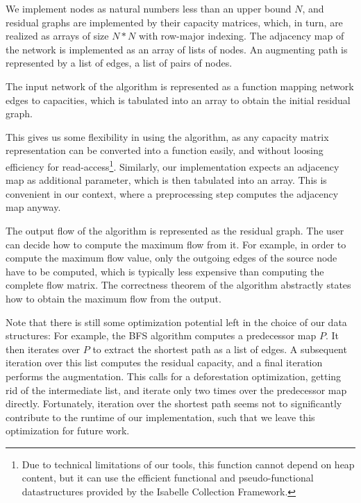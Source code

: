 \documentclass{llncs}
\begin{document}
  We implement nodes as natural numbers less than an upper bound $N$, and residual graphs are implemented by their capacity matrices, which, in turn,
  are realized as arrays of size $N*N$ with row-major indexing.
  The adjacency map of the network is implemented as an array of lists of nodes. 
  An augmenting path is represented by a list of edges, \ie a list of pairs of nodes. 
  
  
  
  The input network of the algorithm is represented as a function mapping network edges to capacities, which is tabulated into an array
  to obtain the initial residual graph.
  
  This gives us some flexibility in using the algorithm, as any capacity matrix representation can be converted into a function easily, and 
  without loosing efficiency for read-access\footnote{Due to technical limitations of our tools, this function 
  cannot depend on heap content, but it can use the efficient functional and pseudo-functional datastructures provided by the Isabelle Collection Framework.}. 
  Similarly, our implementation expects an adjacency map as additional parameter, which is then tabulated into an array. This is convenient in our context, where a preprocessing step computes the adjacency map anyway.
      
  The output flow of the algorithm is represented as the residual graph. The user can decide how to compute the maximum flow from it. For example,
  in order to compute the maximum flow value, only the outgoing edges of the source node have to be computed, which is typically less 
  expensive than computing the complete flow matrix. The correctness theorem of the algorithm abstractly states how to obtain the maximum flow from the output.

  Note that there is still some optimization potential left in the choice of our data structures: 
  For example, the BFS algorithm computes a predecessor map $P$. It then iterates over $P$ to extract the shortest path as a list of edges.
  A subsequent iteration over this list computes the residual capacity, and a final iteration performs the augmentation. 
  This calls for a deforestation optimization,
  getting rid of the intermediate list, and iterate only two times over the predecessor map directly.
  Fortunately, iteration over the shortest path seems not to significantly contribute to the runtime of our implementation, such that we leave this
  optimization for future work.
\end{document}
